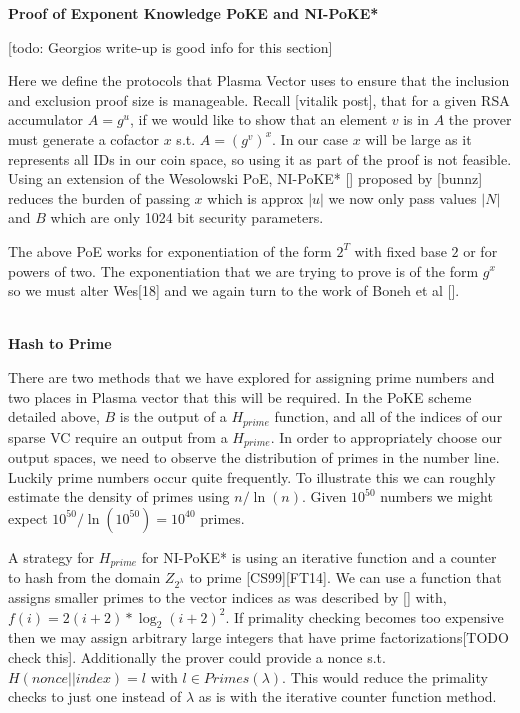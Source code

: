 \documentclass[11pt]{article}
\begin{document}
\centerline{\textbf{Proof of Exponent Knowledge \textbf{PoKE and NI-PoKE*}}}

[todo: Georgios write-up is good info for this section]

Here we define the protocols that Plasma Vector uses to ensure that the inclusion and exclusion proof size is manageable. Recall [vitalik post], that for a given RSA accumulator $A = g^u$, if we would like to show that an element $v$ is in $A$ the prover must generate a cofactor $x$ s.t. $A = (g^v)^x$. In our case $x$ will be large as it represents all IDs in our coin space, so using it as part of the proof is not feasible. Using an extension of the Wesolowski PoE, NI-PoKE* [] proposed by [bunnz] reduces the burden of passing $x$ which is approx $|u|$ we now only pass values $|N|$ and $B$ which are only 1024 bit security parameters.

The above PoE works for exponentiation of the form $2^T$ with fixed base $2$ or for powers of two. The exponentiation that we are trying to prove is of the form $g^x$ so we must alter Wes[18] and we again turn to the work of Boneh et al [].
\\ 
\\

\centerline{\textbf{Hash to Prime}}

There are two methods that we have explored for assigning prime numbers and two places in Plasma vector that this will be required. In the PoKE scheme detailed above, $B$ is the output of a $H_{prime}$ function, and all of the indices of our sparse VC require an output from a $H_{prime}$. In order to appropriately choose our output spaces, we need to observe the distribution of primes in the number line. Luckily prime numbers occur quite frequently. To illustrate this we can roughly estimate the density of primes using $n/\ln(n)$. Given $10^{50}$ numbers we might expect $10^{50}/\ln(10^{50})=10^{40} $ primes.

A strategy for $H_{prime}$ for NI-PoKE* is using an iterative function and a counter to hash from the domain $Z_{2^{\lambda}}$ to prime [CS99][FT14]. We can use a function that assigns smaller primes to the vector indices as was described by [] with, $f(i)=2(i+2)* \log_2(i+2)^2$. If primality checking becomes too expensive then we may assign arbitrary large integers that have prime factorizations[TODO check this]. Additionally the prover could provide a nonce s.t. $H(nonce||index)=l$ with $l \in Primes(\lambda)$. This would reduce the primality checks to just one instead of $\lambda$ as is with the iterative counter function method.
\end{document}
